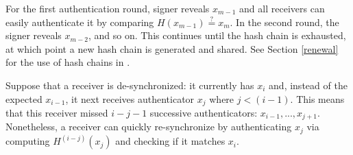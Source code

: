 For the first authentication round, signer reveals $x_{m-1}$ and all receivers can easily
authenticate it by comparing $H(x_{m-1})\stackrel{?}{=}x_m$. In the second round, 
the signer reveals $x_{m-2}$, and so on. This continues until the hash chain is exhausted, 
at which point a new hash chain is generated and shared. See Section \ref{renewal} 
for the use of hash chains in \system.

Suppose that a receiver is de-synchronized: it currently has $x_i$ and, instead
of the expected $x_{i-1}$, it next receives authenticator $x_j$ where $j<(i-1)$. This means that 
this receiver missed $i-j-1$ successive authenticators: $x_{i-1},...,x_{j+1}$.
Nonetheless, a receiver can quickly re-synchronize by authenticating $x_j$ via
computing $H^{(i-j)}(x_j)$ and checking if it matches $x_i$.
